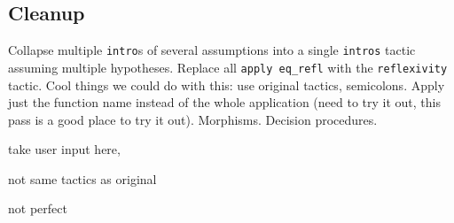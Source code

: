 \subsection{Cleanup}
\label{sec:second}

Collapse multiple \lstinline{intro}s of several assumptions into a single \lstinline{intros} tactic assuming multiple hypotheses.
Replace all \lstinline{apply eq_refl} with the \lstinline{reflexivity} tactic.
Cool things we could do with this: use original tactics, semicolons. Apply just the function name instead of the whole application (need to try it out, this pass is a good place to try it out). Morphisms. Decision procedures.

take user input here,

not same tactics as original

not perfect




